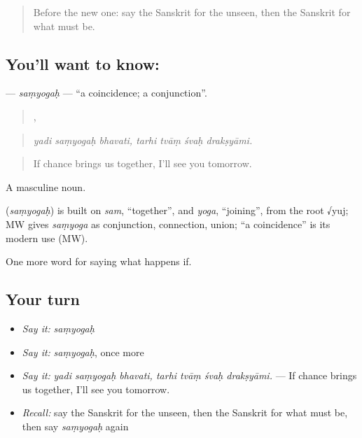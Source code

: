 \label{lesson:SA-C536-samyogah}



\begin{quote}
Before the new one: say the Sanskrit for the unseen, then the Sanskrit for what must be.
\end{quote}

\subsection*{You'll want to know: }
\textbf{} — \emph{saṃyogaḥ} — \textquotedblleft{}a coincidence; a conjunction\textquotedblright{}.

\begin{quote}
  ,    
\end{quote}

\begin{quote}
\emph{yadi saṃyogaḥ bhavati, tarhi tvāṃ śvaḥ drakṣyāmi.}
\end{quote}

\begin{quote}
If chance brings us together, I'll see you tomorrow.
\end{quote}

A masculine noun.

\begin{cousinweb}
\textbf{} (\emph{saṃyogaḥ}) is built on \emph{sam}, \textquotedblleft{}together\textquotedblright{}, and \emph{yoga}, \textquotedblleft{}joining\textquotedblright{}, from the root √yuj; MW gives \emph{saṃyoga} as conjunction, connection, union; \textquotedblleft{}a coincidence\textquotedblright{} is its modern use (MW).
\end{cousinweb}

\begin{grammarlens}[title={What you've built}]
One more word for saying what happens if.
\end{grammarlens}

\subsection*{Your turn}
\begin{itemize}
\raggedright
  \item \emph{Say it:} \emph{saṃyogaḥ}
  \item \emph{Say it:} \emph{saṃyogaḥ}, once more
  \item \emph{Say it:} \emph{yadi saṃyogaḥ bhavati, tarhi tvāṃ śvaḥ drakṣyāmi.} — If chance brings us together, I'll see you tomorrow.
  \item \emph{Recall:} say the Sanskrit for the unseen, then the Sanskrit for what must be, then say \emph{saṃyogaḥ} again
\end{itemize}

